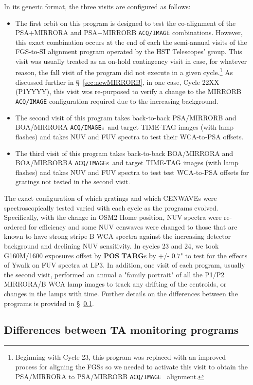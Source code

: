 \documentclass{stsci_report}
\newcommand{\tacq}[1]{\texttt{ACQ/#1}}
\begin{document}
In its generic format, the three visits are configured as follows:
\begin{itemize}
	\item{The first orbit on this program is designed to test the co-alignment of the PSA+MIRRORA and PSA+MIRRORB \tacq{IMAGE} combinations.
However, this exact combination occurs at the end of each the semi-annual visits of the FGS-to-SI alignment program operated by the HST Telescopes' group.
This visit was usually treated as an on-hold contingency visit in case, for whatever reason, the fall visit of the program did not execute in a given cycle.\footnote{Beginning with Cycle 23, this program
was replaced with an improved process for aligning the FGSs so we needed to activate this visit to obtain the PSA/MIRRORA to PSA/MIRRORB \tacq{IMAGE}~ alignment.}
As discussed further in \S~\ref{sec:newMIRRORB}, in one case, Cycle 22XX (P1YYYY), this visit wos re-purposed to verify a change to the MIRRORB
\tacq{IMAGE} configuration required due to the increasing background.}
	\item{The second visit of this program takes back-to-back PSA/MIRRORB and BOA/MIRRORA \tacq{IMAGE}s~and target TIME-TAG images (with lamp flashes) and takes NUV and FUV spectra to test their WCA-to-PSA offsets.}
	\item{The third visit of this program takes back-to-back BOA/MIRRORA and BOA/MIRRORBA \tacq{IMAGE}s~and target TIME-TAG images (with lamp flashes) and takes NUV and FUV spectra to test test WCA-to-PSA offsets for gratings not tested in the second visit.}
\end{itemize}
The exact configuration of which gratings and which CENWAVEs were spectroscopically tested varied with each cycle as the programs evolved.
Specifically, with the change in OSM2 Home position, NUV spectra were re-ordered for efficiency and some NUV cenwaves were changed to those
that are known to have strong stripe B WCA spectra against the increasing detector background and declining NUV sensitivity.
In cycles 23 and 24, we took G160M/1600 exposures offset by {\bf POS$\_$TARG}s by +/- 0.7" to test for the effects of Ywalk on FUV spectra at LP3.
In addition, one visit of each program, usually the second visit, performed an annual a "family portrait"  of all the P1/P2 MIRRORA/B WCA lamp images to track any drifting of the centroids, or changes in the lamps with time.
Further details on the differences between the programs is provided in \S~\ref{subsec:differences}.

\subsection{Differences between TA monitoring programs}\label{subsec:differences}
\end{document}
